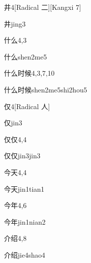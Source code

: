\begin{entry}{井}{4}[Radical 二][Kangxi 7]
  \begin{phonetics}{井}{jing3}
  \end{phonetics}
\end{entry}

\begin{entry}{什么}{4,3}
  \begin{phonetics}{什么}{shen2me5}
  \end{phonetics}
\end{entry}

\begin{entry}{什么时候}{4,3,7,10}
  \begin{phonetics}{什么时候}{shen2me5shi2hou5}
  \end{phonetics}
\end{entry}

\begin{entry}{仅}{4}[Radical 人]
  \begin{phonetics}{仅}{jin3}
  \end{phonetics}
\end{entry}

\begin{entry}{仅仅}{4,4}
  \begin{phonetics}{仅仅}{jin3jin3}
  \end{phonetics}
\end{entry}

\begin{entry}{今天}{4,4}
  \begin{phonetics}{今天}{jin1tian1}
  \end{phonetics}
\end{entry}

\begin{entry}{今年}{4,6}
  \begin{phonetics}{今年}{jin1nian2}
  \end{phonetics}
\end{entry}

\begin{entry}{介绍}{4,8}
  \begin{phonetics}{介绍}{jie4shao4}
  \end{phonetics}
\end{entry}

